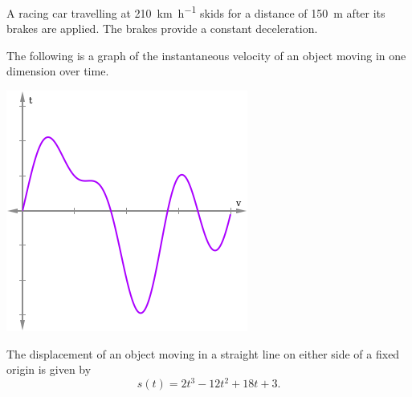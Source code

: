 \begin{questions}
  \questioA A racing car travelling at \SI{210}{\kilo\metre\per\hour} skids for a distance of \SI{150}{\metre}
            after its brakes are applied. The brakes provide a constant deceleration.
  \questioM The following is a graph of the instantaneous velocity of an object moving in one dimension over time.
            \begin{center}
              \includegraphics[width=0.3\linewidth]{velocity2}
            \end{center}
  \questioE The displacement of an object moving in a straight line on either side of a fixed origin is given by
            \begin{displaymath}
              s(t) = 2t^3 - 12t^2 + 18t + 3.
            \end{displaymath}
    \begin{parts}

\end{parts}
\end{questions}
